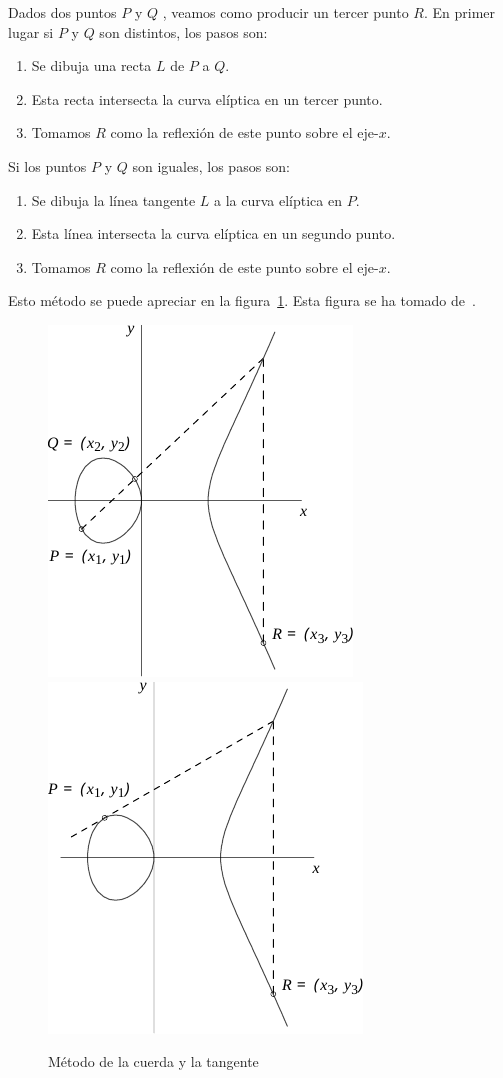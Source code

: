 \begin{metodocuerda}
	Dados dos puntos $P$ y $Q$ , veamos como producir un tercer punto $R$. En primer lugar si $P$ y $Q$ son distintos, los pasos son:
	\begin{enumerate}
		\item Se dibuja una recta $L$ de $P$ a $Q$.
		\item Esta recta intersecta la curva elíptica en un tercer punto.
		\item Tomamos $R$ como la reflexión de este punto sobre el eje-$x$.
	\end{enumerate}
	Si los puntos $P$ y $Q$ son iguales, los pasos son:
	\begin{enumerate}
		\item Se dibuja la línea tangente $L$ a la curva elíptica en $P$.
		\item Esta línea intersecta la curva elíptica en un segundo punto.
		\item Tomamos $R$ como la reflexión de este punto sobre el eje-$x$.
	\end{enumerate}
	Esto método se puede apreciar en la figura~\ref{fig:Método de la cuerda y la tangente}. Esta figura se ha tomado de~\cite{Hankerson:2003}.
\end{metodocuerda}

\begin{figure}[h]
  \myfloatalign
  {\includegraphics[width=.45\linewidth]{Graficos/ejemplo_adiccion.pdf}}
  \quad
  {\includegraphics[width=.45\linewidth]{Graficos/ejemplo_duplicacion.pdf}}
  \caption{Método de la cuerda y la tangente}\label{fig:Método de la cuerda y la tangente}
\end{figure}

